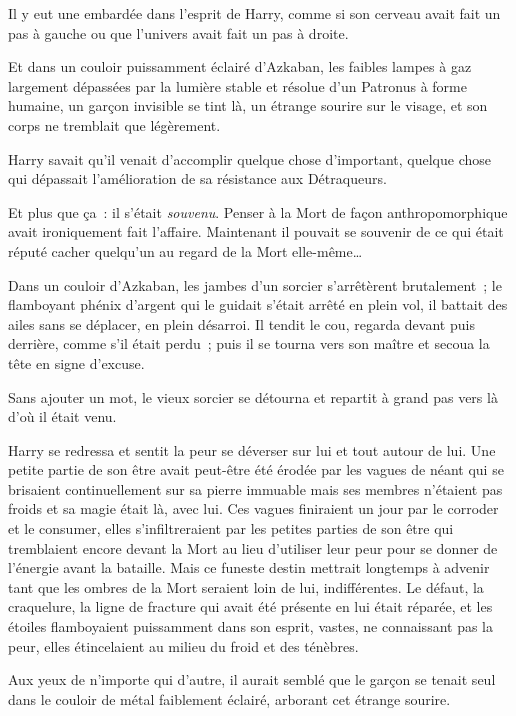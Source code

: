 Il y eut une embardée dans l'esprit de Harry, comme si son cerveau avait fait un pas à gauche ou que l'univers avait fait un pas à droite.

Et dans un couloir puissamment éclairé d'Azkaban, les faibles lampes à gaz largement dépassées par la lumière stable et résolue d'un Patronus à forme humaine, un garçon invisible se tint là, un étrange sourire sur le visage, et son corps ne tremblait que légèrement.

Harry savait qu'il venait d'accomplir quelque chose d'important, quelque chose qui dépassait l'amélioration de sa résistance aux Détraqueurs.

Et plus que ça~: il s'était \emph{souvenu}. Penser à la Mort de façon anthropomorphique avait ironiquement fait l'affaire. Maintenant il pouvait se souvenir de ce qui était réputé cacher quelqu'un au regard de la Mort elle-même…

\later

Dans un couloir d'Azkaban, les jambes d'un sorcier s'arrêtèrent brutalement~; le flamboyant phénix d'argent qui le guidait s'était arrêté en plein vol, il battait des ailes sans se déplacer, en plein désarroi. Il tendit le cou, regarda devant puis derrière, comme s'il était perdu~; puis il se tourna vers son maître et secoua la tête en signe d'excuse.

Sans ajouter un mot, le vieux sorcier se détourna et repartit à grand pas vers là d'où il était venu.

\later

Harry se redressa et sentit la peur se déverser sur lui et tout autour de lui. Une petite partie de son être avait peut-être été érodée par les vagues de néant qui se brisaient continuellement sur sa pierre immuable mais ses membres n'étaient pas froids et sa magie était là, avec lui. Ces vagues finiraient un jour par le corroder et le consumer, elles s'infiltreraient par les petites parties de son être qui tremblaient encore devant la Mort au lieu d'utiliser leur peur pour se donner de l'énergie avant la bataille. Mais ce funeste destin mettrait longtemps à advenir tant que les ombres de la Mort seraient loin de lui, indifférentes. Le défaut, la craquelure, la ligne de fracture qui avait été présente en lui était réparée, et les étoiles flamboyaient puissamment dans son esprit, vastes, ne connaissant pas la peur, elles étincelaient au milieu du froid et des ténèbres.

Aux yeux de n'importe qui d'autre, il aurait semblé que le garçon se tenait seul dans le couloir de métal faiblement éclairé, arborant cet étrange sourire.

